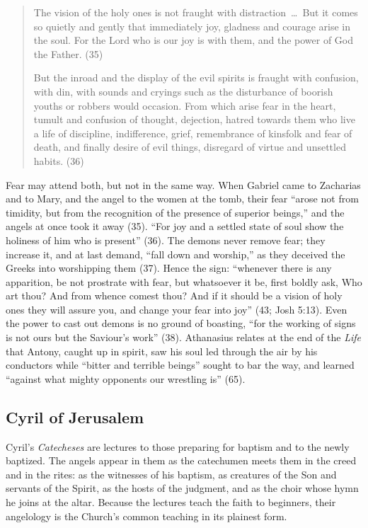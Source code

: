 \begin{quote}
The vision of the holy ones is not fraught with distraction~\dots\ But it
comes so quietly and gently that immediately joy, gladness and courage
arise in the soul. For the Lord who is our joy is with them, and the
power of God the Father. (35)

But the inroad and the display of the evil spirits is fraught with
confusion, with din, with sounds and cryings such as the disturbance of
boorish youths or robbers would occasion. From which arise fear in the
heart, tumult and confusion of thought, dejection, hatred towards them
who live a life of discipline, indifference, grief, remembrance of
kinsfolk and fear of death, and finally desire of evil things, disregard
of virtue and unsettled habits. (36)
\end{quote}

\noindent Fear may attend both, but not in the same way. When Gabriel
came to Zacharias and to Mary, and the angel to the women at the tomb,
their fear ``arose not from timidity, but from the recognition of the
presence of superior beings,'' and the angels at once took it away (35).
``For joy and a settled state of soul show the holiness of him who is
present'' (36). The demons never remove fear; they increase it, and at
last demand, ``fall down and worship,'' as they deceived the Greeks into
worshipping them (37). Hence the sign: ``whenever there is any
apparition, be not prostrate with fear, but whatsoever it be, first
boldly ask, Who art thou? And from whence comest thou? And if it should
be a vision of holy ones they will assure you, and change your fear into
joy'' (43; Josh 5:13). Even the power to cast out demons is no ground of
boasting, ``for the working of signs is not ours but the Saviour's
work'' (38). Athanasius relates at the end of the \emph{Life} that Antony,
caught up in spirit, saw his soul led through the air by his conductors
while ``bitter and terrible beings'' sought to bar the way, and learned
``against what mighty opponents our wrestling is'' (65).

\sectionguard
\subsection{Cyril of Jerusalem}\label{sec:fb-cyril}

Cyril's \emph{Catecheses} are lectures to those preparing for baptism and
to the newly baptized. The angels appear in them as the catechumen meets
them in the creed and in the rites: as the witnesses of his baptism, as
creatures of the Son and servants of the Spirit, as the hosts of the
judgment, and as the choir whose hymn he joins at the altar. Because the
lectures teach the faith to beginners, their angelology is the Church's
common teaching in its plainest form.

